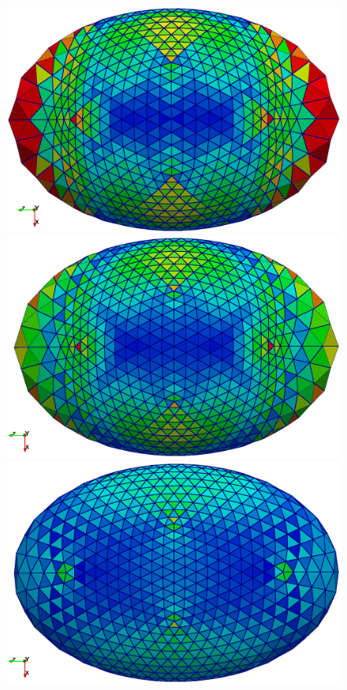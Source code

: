       \begin{figure}
        \begin{minipage}[t]{0.45\textwidth}
        \includegraphics[width=\textwidth]{bilder/meshCorrector/Before_AnglesHeine51c_1k_h001_k10_c07.eps}
        \end{minipage}
        \hfill
        \begin{minipage}[t]{0.49\textwidth}
        \includegraphics[width=\textwidth]{bilder/meshCorrector/step7_AnglesHeine51c_1k_h001_k10_c07.eps}
        \end{minipage}
        \begin{minipage}[t]{0.49\textwidth}
        \includegraphics[width=\textwidth]{bilder/meshCorrector/step1000_AnglesHeine51c_1k_h001_k10_c07.eps}

\end{minipage}
\end{figure}
